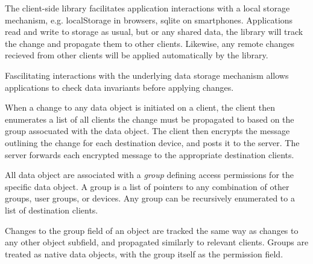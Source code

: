 

The \name{} client-side library facilitates application interactions with
a local storage mechanism, e.g. localStorage in browsers, sqlite on 
smartphones. Applications read and write to storage as usual, but or 
any shared data, the library will track the change and propagate them to
other clients. Likewise, any remote changes recieved from other clients
will be applied automatically by the library.

Fascilitating interactions with the underlying data storage mechanism
allows \name{} applications to check data invariants before applying 
changes.
  
When a change to any data object is initiated on a client, the client
then enumerates a list of all clients the change must be propagated to
based on the group assocuated with the data object.
The client then encrypts the message outlining the change for each 
destination device, and posts it to the server. The server forwards
each encrypted message to the appropriate destination clients.

All data object are associated with a \textit{group} defining access 
permissions for the specific data object. A group is a list of pointers 
to any combination of other groups, user groups, or devices. Any group
can be recursively enumerated to a list of destination clients. 

Changes to the group field of an object are tracked the same way as 
changes to any other object subfield, and propagated similarly to 
relevant clients. Groups are treated as \name{} native data objects,
with the group itself as the permission field.  










